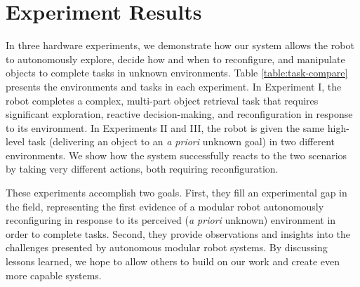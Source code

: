 \documentclass[journal]{IEEEtran}
\newcommand{\lt}{{\tt True }}
\begin{document}


\section{Experiment Results}
\label{sec:experiments}
%

In three hardware experiments, we demonstrate how our system allows the robot to autonomously explore, decide how and when to reconfigure, and manipulate objects to complete tasks in unknown environments. Table \ref{table:task-compare} presents the environments and tasks in each experiment.
In Experiment I, the robot completes a complex, multi-part object retrieval task that requires significant exploration, reactive decision-making, and reconfiguration in response to its environment.
In Experiments II and III, the robot is given the same high-level task (delivering an object to an \textit{a priori} unknown goal) in two different environments.  We show how the system successfully reacts to the two scenarios by taking very different actions, both requiring reconfiguration.

These experiments accomplish two goals.  First, they fill an experimental
gap in the field, representing the first evidence of a modular robot autonomously reconfiguring in response to its perceived (\textit{a priori} unknown) environment in order to complete tasks.  Second, they provide observations and insights into the challenges presented by autonomous modular robot systems.  By discussing lessons learned, we hope to allow others to build on our work and create even more capable systems. 

\end{document}
